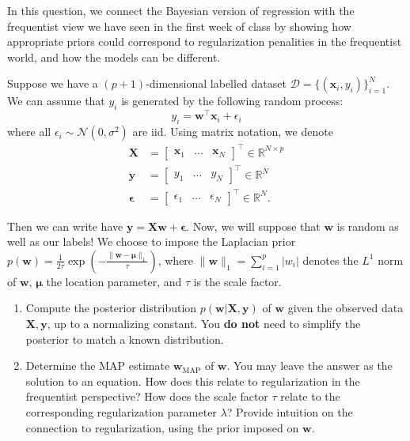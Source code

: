 \documentclass[submit]{harvardml}
\begin{document}
\newpage

\begin{problem}
    In this question, we connect the Bayesian version of regression with the frequentist view we have seen in the first week of class by showing how appropriate priors could correspond to regularization penalities in the frequentist world, and how the models can be different.
    
    Suppose we have a $(p+1)$-dimensional labelled dataset $\mathcal{D} = \{(\mathbf{x}_i, y_i)\}_{i=1}^N$. We can assume that $y_i$ is generated by the following random process: $$y_i = \mathbf{w}^\top\mathbf{x}_i + \epsilon_i$$ where all $\epsilon_i \sim \mathcal{N}(0,\sigma^2)$ are iid. Using matrix notation, we denote
    \begin{align*}
      \mathbf{X} &= \begin{bmatrix}\mathbf{x}_1 & \ldots & \mathbf{x}_N\end{bmatrix}^\top \in \mathbb{R}^{N \times p} \\
      \mathbf{y} &= \begin{bmatrix} y_1 & \dots & y_N \end{bmatrix}^\top  \in \mathbb{R}^N \\
      \mathbf{\epsilon} &= \begin{bmatrix} \epsilon_1 & \dots & \epsilon_N \end{bmatrix}^\top \in \mathbb{R}^N.
    \end{align*}
    
    Then we can write have $\mathbf{y} = \mathbf{X}\mathbf{w} + \mathbf{\epsilon}$. Now, we will suppose that $\mathbf{w}$ is random as well as our labels! We choose to impose the Laplacian prior $p(\mathbf{w})=\frac{1}{2\tau}\exp\left(-\frac{\|\mathbf{w}-\mathbf{\mu}\|_1}{\tau}\right)$, where $\|\mathbf{w}\|_1=\sum_{i=1}^p |w_i|$ denotes the $L^1$ norm of $\mathbf{w}$, $\mathbf{\mu}$ the location parameter, and $\tau$ is the scale factor.
    
    \begin{enumerate}
    
        \item Compute the posterior distribution $p(\mathbf{w}|\mathbf{X}, \mathbf{y})$ of $\mathbf{w}$ given the observed data $\mathbf{X}, \mathbf{y}$, up to a normalizing constant. You \textbf{do not} need to simplify the posterior to match a known distribution.
        
        \item Determine the MAP estimate $\mathbf{w}_{\mathrm{MAP}}$ of $\mathbf{w}$. You may leave the answer as the solution to an equation. How does this relate to regularization in the frequentist perspective? How does the scale factor $\tau$ relate to the corresponding regularization parameter $\lambda$? Provide intuition on the connection to regularization, using the prior imposed on $\mathbf{w}$.
        

\end{enumerate}
\end{problem}
\end{document}
